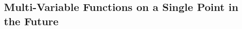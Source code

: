 \documentclass[10pt,a4paper]{paper}
\theoremstyle{definition}
\newcommand{\states}{\mathcal{X}}
\newcommand{\gambles}{\mathcal{L}}
\begin{document}
%
%

\subsection{Multi-Variable Functions on a Single Point in the Future}\label{sec:function_single_future_multiple_past}
\end{document}
